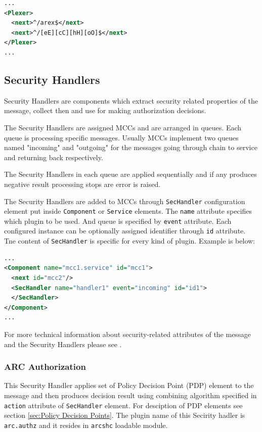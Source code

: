 \documentclass{article}
\begin{document}
\begin{lstlisting}[language=xml]
...
<Plexer>
  <next>^/arex$</next>
  <next>^/[eE][cC][hH][oO]$</next>
</Plexer>
...
\end{lstlisting}

\subsection{Security Handlers}\label{sec:Security Handlers}
Security Handlers are components which extract security related properties of
the message, collect then and use for making authorization decisions.

The Security Handlers are assigned MCCs and are arranged in queues. Each queue
is processing specific messages. Usually MCCs implement two queues named
"incoming" and "outgoing" for the messages going through chain to service
and returning back respectively.

The Security Handlers in each queue are applied sequentially and if any
produces negative result processing stops are error is raised.

The Security Handlers are added to MCCs through \texttt{SecHandler} configuration
element put inside \texttt{Component} or \texttt{Service} elements. The
\texttt{name} attribute specifies which plugin to be used. And queue is
specified by \texttt{event} attribute. Each configured instance can be
optionally assigned identifier through \texttt{id} attribute. Tne content
of \texttt{SecHandler} is specific for every kind of plugin.
Example is below:
\begin{lstlisting}[language=xml]
...
<Component name="mcc1.service" id="mcc1">
  <next id="mcc2"/>
  <SecHandler name="handler1" event="incoming" id="id1">
  </SecHandler>
</Component>
...
\end{lstlisting}

For more technical information about security-related attributes of the
message and the Security Handlers please see \cite{arc1-security}.

\subsubsection{ARC Authorization}\label{sec:arcauthz-shc}
This Security Handler applies set of Policy Decision Point (PDP) element to the
message and then produces decision result using combining algorithm specified in
\texttt{action} attribute of \texttt{SecHandler} element. For desciption of PDP
elements see section \ref{sec:Policy Decision Points}. The plugin name of this
Secirity hadler is \texttt{arc.authz} and it resides in \texttt{arcshc} loadable module.
\end{document}
